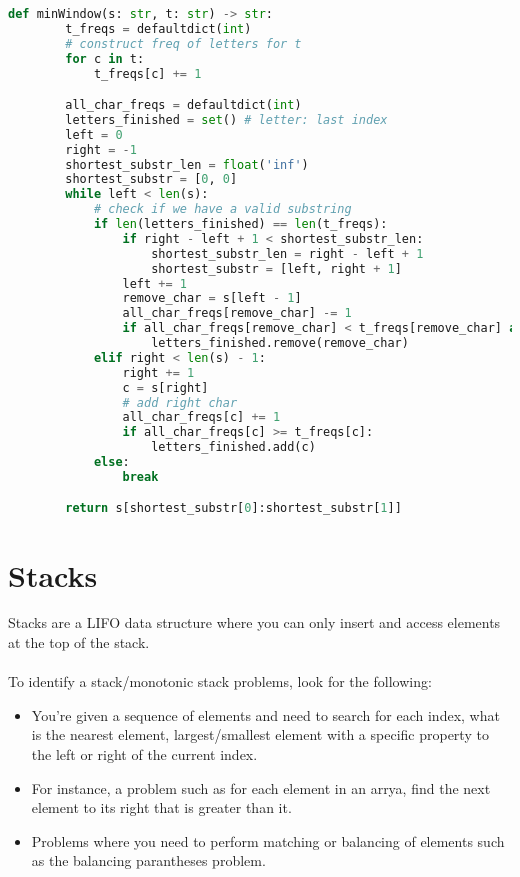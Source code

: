\begin{lstlisting}[language=Python, caption=Minimum Window Substring]
    def minWindow(s: str, t: str) -> str:
        t_freqs = defaultdict(int)
        # construct freq of letters for t
        for c in t:
            t_freqs[c] += 1

        all_char_freqs = defaultdict(int)
        letters_finished = set() # letter: last index
        left = 0
        right = -1
        shortest_substr_len = float('inf')
        shortest_substr = [0, 0]
        while left < len(s):
            # check if we have a valid substring
            if len(letters_finished) == len(t_freqs):
                if right - left + 1 < shortest_substr_len:
                    shortest_substr_len = right - left + 1
                    shortest_substr = [left, right + 1]
                left += 1
                remove_char = s[left - 1]
                all_char_freqs[remove_char] -= 1
                if all_char_freqs[remove_char] < t_freqs[remove_char] and remove_char in letters_finished:
                    letters_finished.remove(remove_char) 
            elif right < len(s) - 1:
                right += 1
                c = s[right]
                # add right char 
                all_char_freqs[c] += 1         
                if all_char_freqs[c] >= t_freqs[c]:
                    letters_finished.add(c)
            else:
                break

        return s[shortest_substr[0]:shortest_substr[1]] 
\end{lstlisting}

\section{Stacks}
Stacks are a LIFO data structure where you can only insert and access elements at the top of the stack.\\
\\
To identify a stack/monotonic stack problems, look for the following:
\begin{itemize}
    \item You're given a sequence of elements and need to search for each index, what is the nearest element, largest/smallest element
          with a specific property to the left or right of the current index.
    \item For instance, a problem such as for each element in an arrya, find the next element to its right that is greater than it.
    \item Problems where you need to perform matching or balancing of elements such as the balancing parantheses problem.
\end{itemize}

